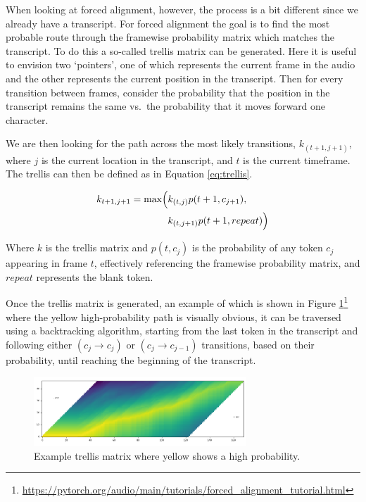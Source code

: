 \documentclass[twocolumn,twoside]{article}
\begin{document}
When looking at forced alignment, however, the process is a bit
different since we already have a transcript. For forced alignment the
goal is to find the most probable route through the framewise
probability matrix which matches the transcript. To do this a so-called
trellis matrix can be generated. Here it is useful to envision two
`pointers', one of which represents the current frame in the audio and
the other represents the current position in the transcript. Then for
every transition between frames, consider the probability that the
position in the transcript remains the same vs.~the probability that it
moves forward one character.

We are then looking for the path across the most likely transitions,
\(k_{(t+1, j+1)}\), where \(j\) is the current location in the
transcript, and \(t\) is the current timeframe. The trellis can then be
defined as in Equation \ref{eq:trellis}.

\begin{align}
\label{eq:trellis}
k_{t+1, j+1} = \max \Bigl( & k_{(t,j)}p(t+1, c_{j+1}), \\
& k_{(t,j+1)}p(t+1, repeat) \Bigr) \nonumber
\end{align}

Where \(k\) is the trellis matrix and \(p(t, c_j)\) is the probability
of any token \(c_j\) appearing in frame \(t\), effectively referencing
the framewise probability matrix, and \(repeat\) represents the blank
token.

Once the trellis matrix is generated, an example of which is shown in
Figure \ref{fig:trellis-matrix}\footnote{\url{https://pytorch.org/audio/main/tutorials/forced\_alignment\_tutorial.html}}
where the yellow high-probability path is visually obvious, it can be
traversed using a backtracking algorithm, starting from the last token
in the transcript and following either \((c_j \rightarrow c_j)\) or
\((c_j \rightarrow c_{j-1})\) transitions, based on their probability,
until reaching the beginning of the transcript.

\begin{figure}[h]
\centering
\includegraphics[width=8cm]{trellis-matrix}
\caption{Example trellis matrix where yellow shows a high probability. \label{fig:trellis-matrix}}
\end{figure}
\end{document}
